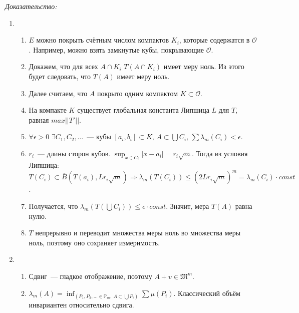 \documentclass[paper=a4, fontsize=11pt]{article}
\begin{document}
\emph{Доказательство:}
\begin{enumerate}
    \item
    \begin{enumerate}
        \item $E$ можно покрыть счётным числом компактов $K_i$, которые содержатся в $\mathscr{O}$.
        Например, можно взять замкнутые кубы, покрывающие $\mathscr{O}$.
        \item Докажем, что для всех $A \cap K_i$ $T(A \cap K_i)$ имеет меру ноль. Из этого будет следовать, что $T(A)$ имеет меру ноль.
        \item Далее считаем, что $A$ покрыто одним компактом $K \subset \mathscr{O}$.
        \item На компакте $K$ существует глобальная константа Липшица $L$ для $T$, равная $max ||T'||$.
        \item $\forall \epsilon > 0$ $\exists C_1,C_2,\dots$~--- кубы $[a_i,b_i] \subset K$,
        $A \subset \bigcup C_i$, $\sum \lambda_m(C_i) < \epsilon$.
        \item $r_i$~--- длины сторон кубов. $\sup_{x \in C_i}|x-a_i| = r_i\sqrt{m}$. Тогда из условия Липшица:
        $T(C_i) \subset \overline{B}(T(a_i),Lr_i\sqrt{m}) \Rightarrow \lambda_m(T(C_i)) \leq (2Lr_i\sqrt{m})^m =
        \lambda_m(C_i)\cdot const$.
        \item Получается, что $\lambda_m(T(\bigcup C_i)) \leq \epsilon \cdot const$. Значит, мера $T(A)$ равна нулю.
        \item $T$ непрерывно и переводит множества меры ноль во множества меры ноль, поэтому оно сохраняет измеримость.
    \end{enumerate}
    \item
    \begin{enumerate}
        \item Сдвиг~--- гладкое отображение, поэтому $A+v \in \mathfrak{M}^m$.
        \item $\lambda_m(A) = \inf_{(P_1,P_2,\dots \in \mathds{P}_m,\ A \subset \bigcup P_i)} \sum \mu(P_i)$.
        Классический объём инвариантен относительно сдвига.
    \end{enumerate}
\end{enumerate}
\end{document}
